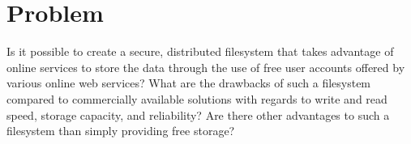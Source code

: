 
\section{Problem}
\label{sec:problem}

Is it possible to create a secure, distributed filesystem that takes advantage of online services to store the data through the use of free user accounts offered by various online web services? What are the drawbacks of such a filesystem compared to commercially available solutions with regards to write and read speed, storage capacity, and reliability? Are there other advantages to such a filesystem than simply providing free storage?



